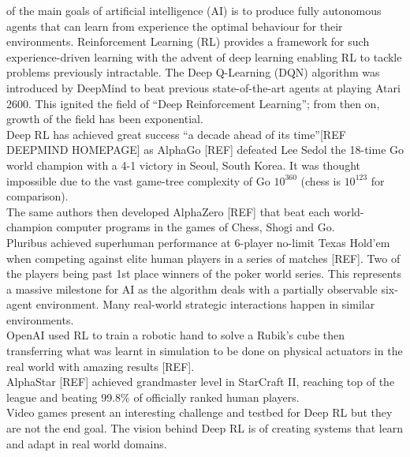 \documentclass[10pt,journal,compsoc]{IEEEtran}
\begin{document}
% 
% 
% 
% 
 of the main goals of artificial intelligence (AI) is to produce fully autonomous agents that can learn from experience the optimal behaviour for their environments. Reinforcement Learning (RL) provides a framework for such experience-driven learning with the advent of deep learning enabling RL to tackle problems previously intractable.   The Deep Q-Learning (DQN) algorithm was introduced by DeepMind to beat previous state-of-the-art agents at playing Atari 2600. This ignited the field of “Deep Reinforcement Learning”; from then on, growth of the field has been exponential.
\\
Deep RL has achieved great success “a decade ahead of its time”[REF DEEPMIND HOMEPAGE] as AlphaGo [REF] defeated Lee Sedol the 18-time Go world champion with a 4-1 victory in Seoul, South Korea. It was thought impossible due to the vast game-tree complexity of Go \begin{math}10^{360}\end{math} (chess is \begin{math}10^{123}\end{math} for comparison). 
\\
The same authors then developed AlphaZero [REF] that beat each world-champion computer programs in the games of Chess, Shogi and Go.
\\
Pluribus achieved superhuman performance at 6-player no-limit Texas Hold’em when competing against elite human players in a series of matches [REF]. Two of the players being past 1st place winners of the poker world series. This represents a massive milestone for AI as the algorithm deals with a partially observable six-agent environment. Many real-world strategic interactions happen in similar environments.
\\
OpenAI used RL to train a robotic hand to solve a Rubik’s cube then transferring what was learnt in simulation to be done on physical actuators in the real world with amazing results [REF]. 
\\
AlphaStar [REF] achieved grandmaster level in StarCraft II, reaching top of the league and beating 99.8\% of officially ranked human players.
\\
Video games present an interesting challenge and testbed for Deep RL but they are not the end goal. The vision behind Deep RL is of creating systems that learn and adapt in real world domains.
\end{document}

